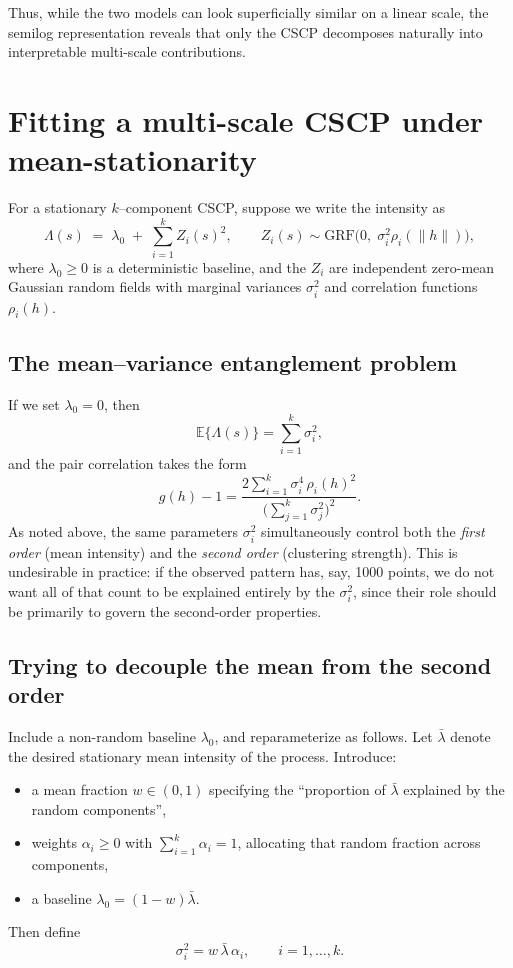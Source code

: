 \documentclass[11pt]{article}
\begin{document}
Thus, while the two models can look superficially similar on a linear scale, the semilog representation reveals that only the CSCP decomposes naturally into interpretable multi-scale contributions.






\section{Fitting a multi-scale CSCP under mean-stationarity}

For a stationary $k$--component CSCP, suppose we write the intensity  as
\[
\Lambda(s) \;=\; \lambda_0 \;+\; \sum_{i=1}^k Z_i(s)^2,
\qquad
Z_i(s)\sim \text{GRF}\big(0,\;\sigma_i^2 \rho_i(\|h\|)\big),
\]
where $\lambda_0 \ge 0$ is a deterministic baseline, and the $Z_i$ are independent zero-mean Gaussian random fields with marginal variances $\sigma_i^2$ and correlation functions $\rho_i(h)$.  

\subsection{The mean--variance entanglement problem}

If we set $\lambda_0=0$, then
\[
\mathbb E\{\Lambda(s)\} = \sum_{i=1}^k \sigma_i^2,
\]
and the pair correlation takes the form
\[
g(h)-1 = \frac{2\sum_{i=1}^k \sigma_i^4\,\rho_i(h)^2}{\big(\sum_{j=1}^k \sigma_j^2\big)^2}.
\]
As noted above, the same parameters $\sigma_i^2$ simultaneously control both the \emph{first order} (mean intensity) and the \emph{second order} (clustering strength).  
This is undesirable in practice: if the observed pattern has, say, 1000 points, we do not want all of that count to be explained entirely by the $\sigma_i^2$, since their role should be primarily to govern the second-order properties.

\subsection{Trying to decouple the mean from the second order}

Include a non-random baseline $\lambda_0$, and reparameterize as follows. Let $\bar\lambda$ denote the desired stationary mean intensity of the process. Introduce:
\begin{itemize}
	\item a mean fraction $w \in (0,1)$ specifying the ``proportion of $\bar\lambda$ explained by the random components'',
	\item weights $\alpha_i \ge 0$ with $\sum_{i=1}^k \alpha_i = 1$, allocating that random fraction across components,
	\item a baseline $\lambda_0 = (1-w)\bar\lambda$.
\end{itemize}
Then define
\[
\sigma_i^2 = w\,\bar\lambda\,\alpha_i, \qquad i=1,\ldots,k.
\]
\end{document}
